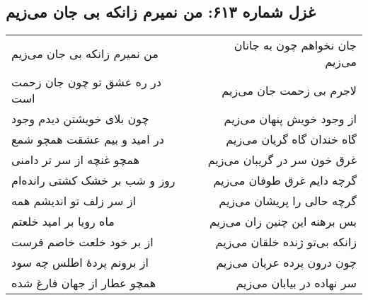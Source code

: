 \begin{center}
\section*{غزل شماره ۶۱۳: من نمیرم زانکه بی جان می‌زیم}
\label{sec:613}
\begin{longtable}{l p{0.5cm} r}
من نمیرم زانکه بی جان می‌زیم
&&
جان نخواهم چون به جانان می‌زیم
\\
در ره عشق تو چون جان زحمت است
&&
لاجرم بی زحمت جان می‌زیم
\\
چون بلای خویشتن دیدم وجود
&&
از وجود خویش پنهان می‌زیم
\\
در امید و بیم عشقت همچو شمع
&&
گاه خندان گاه گریان می‌زیم
\\
همچو غنچه از سر تر دامنی
&&
غرق خون سر در گریبان می‌زیم
\\
روز و شب بر خشک کشتی رانده‌ام
&&
گرچه دایم غرق طوفان می‌زیم
\\
از سر زلف تو اندیشم همه
&&
گرچه حالی را پریشان می‌زیم
\\
ماه رویا بر امید خلعتم
&&
بس برهنه این چنین زان می‌زیم
\\
از بر خود خلعت خاصم فرست
&&
زانکه بی‌تو ژنده خلقان می‌زیم
\\
از برونم پردهٔ اطلس چه سود
&&
چون درون پرده عریان می‌زیم
\\
همچو عطار از جهان فارغ شده
&&
سر نهاده در بیابان می‌زیم
\\
\end{longtable}
\end{center}
